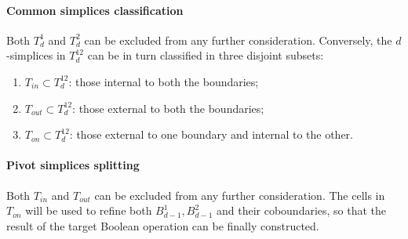 \documentclass[11pt,oneside]{article}	%
\begin{document}
\paragraph{Common simplices classification}
Both $T_d^1$ and $T_d^2$ can be excluded from any further consideration. Conversely, the $d$-simplices in $T_d^{12}$ can be in turn classified in three disjoint subsets: 
\begin{enumerate}
\item $T_{{in}}\subset T_d^{12}$: those internal to both the boundaries;
\item $T_{{out}}\subset T_d^{12}$: those external to both the boundaries;
\item $T_{{on}}\subset T_d^{12}$: those external to one boundary and internal to the other.
\end{enumerate}

\paragraph{Pivot simplices splitting}
Both $T_{{in}}$ and $T_{{out}}$ can be excluded from any further consideration. The cells in $T_{{on}}$ will be used to refine both $B_{d-1}^1,B_{d-1}^2$ and their coboundaries, so that the result of the target Boolean operation can be finally constructed. 


\end{document}
